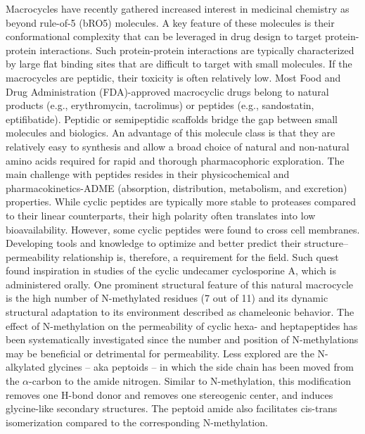 Macrocycles have recently gathered increased interest in medicinal chemistry as beyond rule-of-5 (bRO5) molecules. \cite{Driggers2008, Mallinson2012, Doak2014, Dougherty2017, Marsault2011, Abdalla2018, Marsault2017, Caron2021}
A key feature of these molecules is their conformational complexity that can be leveraged in drug design to target protein-protein interactions. \cite{ Chene2006, Janin2008, Jones13, Scott2016, Modell2016}
Such protein-protein interactions are typically characterized by large flat binding sites that are difficult to target with small molecules. \cite{Doak2016}
If the macrocycles are peptidic, their toxicity is often relatively low. \cite{Zorzi2017}
Most Food and Drug Administration (FDA)-approved macrocyclic drugs belong to natural products (e.g., erythromycin, tacrolimus) or peptides (e.g., sandostatin, eptifibatide). \cite{Giordanetto2014}
Peptidic or semipeptidic scaffolds bridge the gap between small molecules and biologics. An advantage of this molecule class is that they are relatively easy to synthesis and allow a broad choice of natural and non-natural amino acids required for rapid and thorough pharmacophoric exploration. 
The main challenge with peptides resides in their physicochemical and pharmacokinetics-ADME (absorption, distribution, metabolism, and excretion) properties. 
While cyclic peptides are typically more stable to proteases compared to their linear counterparts, their high polarity often translates into low bioavailability.\cite{Naylor2017, Fosgerau2015}
However, some cyclic peptides were found to cross cell membranes.\cite{Naylor2017, Wang2014, Nielsen2014} 
Developing tools and knowledge to optimize and better predict their structure–permeability relationship is, therefore, a requirement for the field. Such quest found inspiration in studies of the cyclic undecamer cyclosporine A, which is administered orally. 
One prominent structural feature of this natural macrocycle is the high number of N-methylated residues (7 out of 11) and its dynamic structural adaptation to its environment described as chameleonic behavior. \cite{Whitty2016, Danelius2020, Witek2017}
The effect of N-methylation on the permeability of cyclic hexa- and heptapeptides has been systematically investigated since the number and position of N-methylations may be beneficial or detrimental for permeability. \cite{Nielsen2014, Raeder2018, White2011, Beck2012, Biron2008, White2011} 
%
Less explored are the N-alkylated glycines -- aka peptoids -- in which the side chain has been moved from the $\alpha$-carbon to the amide nitrogen. \cite{Schwochert2015} 
Similar to N-methylation, this modification removes one H-bond donor and removes one stereogenic center, and induces glycine-like secondary structures.
The peptoid amide also facilitates cis-trans isomerization compared to the corresponding N-methylation.\cite{Sui2007} 


